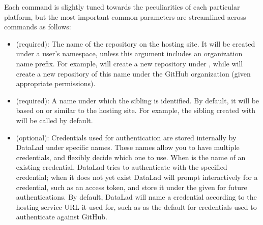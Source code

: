 \sphinxAtStartPar
Each command is slightly tuned towards the peculiarities of each particular platform, but the most important common parameters are streamlined across commands as follows:
\begin{itemize}
\item {} 
\sphinxAtStartPar
\sphinxcode{\sphinxupquote{{[}REPONAME{]}}} (required): The name of the repository on the hosting site. It will be created under a user’s namespace, unless this argument includes an organization name prefix. For example,  will create a new repository under , while  will create a new repository of this name under the GitHub organization  (given appropriate permissions).

\item {} 
\sphinxAtStartPar
{} (required): A name under which the sibling is identified. By default, it will be based on or similar to the hosting site. For example, the sibling created with  will  be called  by default.

\item {} 
\sphinxAtStartPar
{} (optional): Credentials used for authentication are stored internally by DataLad under specific names. These names allow you to have multiple credentials, and flexibly decide which one to use. When  is the name of an existing credential, DataLad tries to authenticate with the specified credential; when it does not yet exist DataLad will prompt interactively for a credential, such as an access token, and store it under the given  for future authentications. By default, DataLad will name a credential according to the hosting service URL it used for, such as  as the default for credentials used to authenticate against GitHub.


\end{itemize}
